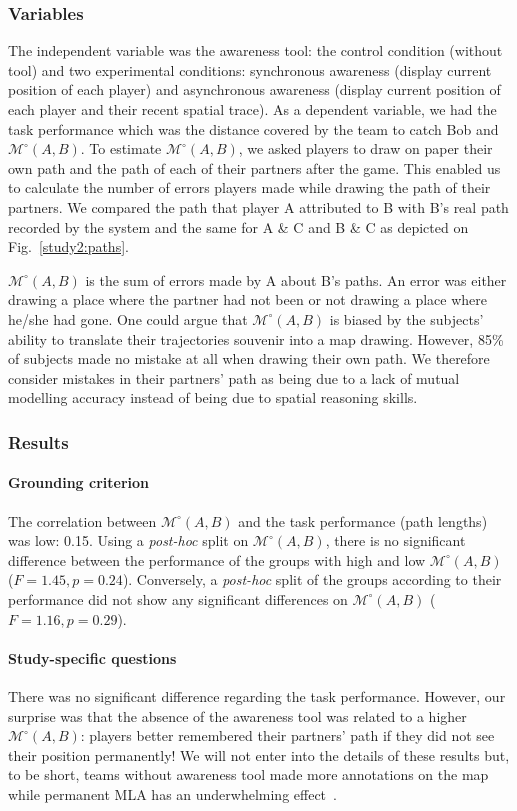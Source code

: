\documentclass[twocolumn]{article}
\newcommand{\gModel}[2]{{$\mathcal{M}^{\circ}(#1, #2)$}}
\begin{document}
\subsubsection*{Variables}

The independent variable was the awareness tool: the control condition (without
tool) and two experimental conditions: synchronous awareness (display current
position of each player) and asynchronous awareness (display current position of
each player and their recent spatial trace).  As a dependent variable, we had
the task performance which was the distance covered by the team to catch Bob and
\gModel{A}{B}. To estimate \gModel{A}{B}, we asked players to draw on paper
their own path and the path of each of their partners after the game. This
enabled us to calculate the number of errors players made while drawing the path
of their partners. We compared the path that player A attributed to B with B's
real path recorded by the system and the same for A \& C and B \& C as depicted
on Fig.~\ref{study2:paths}. 

\gModel{A}{B} is the sum of errors made by A about B's paths. An error was
either drawing a place where the partner had not been or not drawing a place
where he/she had gone. One could argue that \gModel{A}{B} is biased by the
subjects' ability to translate their trajectories souvenir into a map drawing.
However, 85\% of subjects made no mistake at all when drawing their own path. We
therefore consider mistakes in their partners' path as being due to a lack of
mutual modelling accuracy instead of being due to spatial reasoning skills.

\subsubsection*{Results}

\paragraph{Grounding criterion} The correlation between \gModel{A}{B} and the
task performance (path lengths) was low: 0.15. Using a \emph{post-hoc} split on
\gModel{A}{B}, there is no significant difference between the performance of the
groups with high and low \gModel{A}{B}  ($F = 1.45, p = 0.24$). Conversely, a
\emph{post-hoc} split of the groups according to their performance did not show
any significant differences on \gModel{A}{B} ($F = 1.16, p = 0.29$).

\paragraph{Study-specific questions} There was no significant difference
regarding the task performance. However, our surprise was that the absence of
the awareness tool was related to a higher \gModel{A}{B}: players better
remembered their partners' path if they did not see their position permanently!
We will not enter into the details of these results but, to be short, teams
without awareness tool made more annotations on the map while permanent MLA has
an underwhelming effect~\citep{nova2005location}.
\end{document}
